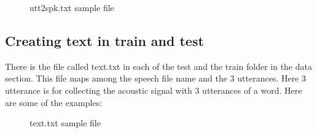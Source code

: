 \documentclass{standalone}
\begin{document}
    \begin{figure}[h]
 \centering
 \caption{utt2spk.txt sample file}
\label{fig:utt2spk}
\end{figure}
   
        
    \subsection{Creating text in train and test}
      There is the file called text.txt in each of the test and the train folder in the data section. This file maps among the speech file name and the 3 utterances. Here 3 utterance is for collecting the acoustic signal with 3 utterances of a word. Here are some of the examples:
    \\
   \begin{figure}[h]
 \centering
 \caption{text.txt sample file}
\label{fig:text.txt sample}
\end{figure}
            
\end{document}
